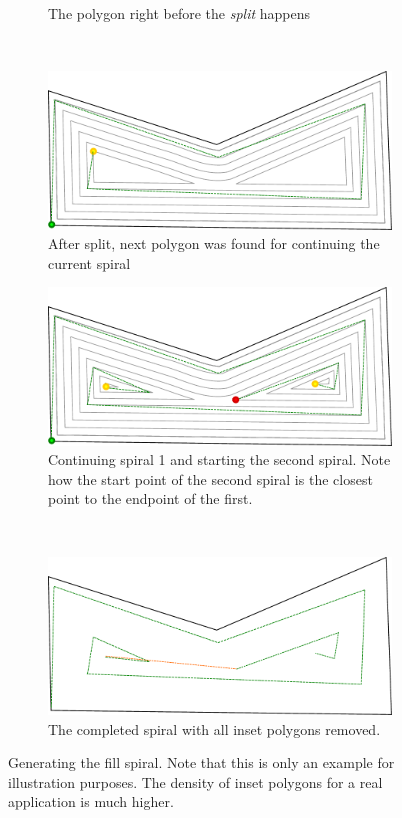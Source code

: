 \begin{figure}[htbp]
\begin{subfigure}[b]{0.45\textwidth}
    		\caption{The polygon right before the \textit{split} happens}
    \end{subfigure}~
    \begin{subfigure}[b]{0.45\textwidth}
    		\includegraphics[width=\textwidth]{images/algorithms/spiral_fill/done.pdf}
    		\caption{After split, next polygon was found for continuing the current spiral}

    \end{subfigure}
        \begin{subfigure}[b]{0.45\textwidth}
    		\includegraphics[width=\textwidth]{images/algorithms/spiral_fill/after_done_2.pdf}
    		\caption{Continuing spiral 1 and starting the second spiral. Note how the start point of the second spiral is the closest point to the endpoint of the first.} \label{splitevent}
    \end{subfigure}
\\
        \begin{subfigure}[b]{0.45\textwidth}
    		\includegraphics[width=\textwidth]{images/algorithms/spiral_fill/complete_done.pdf}
    		\caption{The completed spiral with all inset polygons removed.}
    \end{subfigure}
	\caption{Generating the fill spiral. Note that this is only an example for illustration purposes. The density of inset polygons for a real application is much higher.} \label{fig:insetting}
\end{figure}

